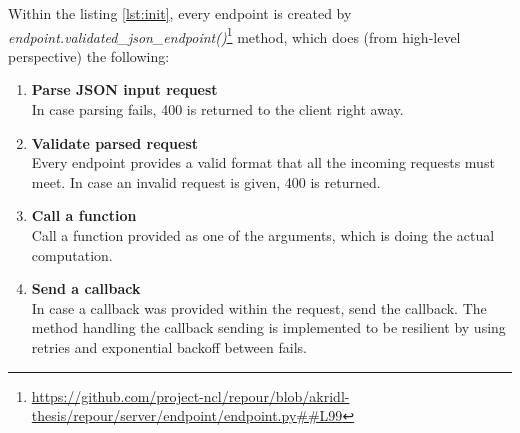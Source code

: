 \documentclass[../main.tex]{subfiles}
\begin{document}
Within the listing \ref{lst:init}, every endpoint is created by\\
\textit{endpoint.validated\_json\_endpoint()}\footnote{\url{https://github.com/project-ncl/repour/blob/akridl-thesis/repour/server/endpoint/endpoint.py##L99}} method, which does (from high-level perspective) the following:

\begin{enumerate}
    \item \textbf{Parse JSON input request}\\
    In case parsing fails, 400 is returned to the client right away.

    \item \textbf{Validate parsed request}\\
    Every endpoint provides a valid format that all the incoming requests must meet. In case an invalid request is given, 400 is returned.

    \item \textbf{Call a function}\\
    Call a function provided as one of the arguments, which is doing the actual computation.

    \item \textbf{Send a callback}\\
    In case a callback was provided within the request, send the callback. The method handling the callback sending is implemented to be resilient by using retries and exponential backoff between fails.

\end{enumerate}
\end{document}
